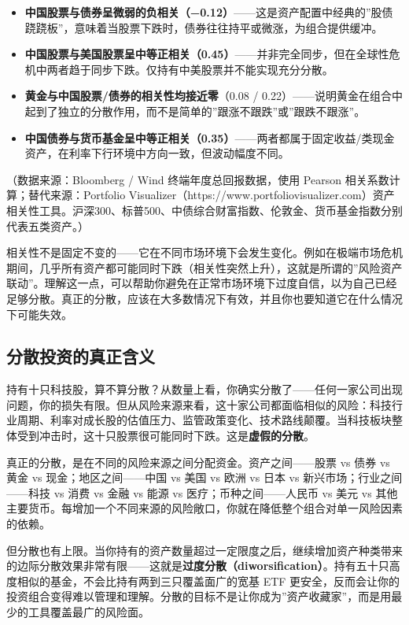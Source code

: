 \documentclass[a4paper,11pt,oneside,fontset=none,UTF8,zihao=-4]{ctexbook}
\providecommand{\tightlist}{\setlength{\itemsep}{2pt}\setlength{\parskip}{1pt}}
\begin{document}
\begin{itemize}
\tightlist
\item
  \textbf{中国股票与债券呈微弱的负相关（−0.12）}------这是资产配置中经典的''股债跷跷板''，意味着当股票下跌时，债券往往持平或微涨，为组合提供缓冲。
\item
  \textbf{中国股票与美国股票呈中等正相关（0.45）}------并非完全同步，但在全球性危机中两者趋于同步下跌。仅持有中美股票并不能实现充分分散。
\item
  \textbf{黄金与中国股票/债券的相关性均接近零}（0.08 /
  0.22）------说明黄金在组合中起到了独立的分散作用，而不是简单的''跟涨不跟跌''或''跟跌不跟涨''。
\item
  \textbf{中国债券与货币基金呈中等正相关（0.35）}------两者都属于固定收益/类现金资产，在利率下行环境中方向一致，但波动幅度不同。
\end{itemize}

（数据来源：Bloomberg / Wind 终端年度总回报数据，使用 Pearson
相关系数计算；替代来源：Portfolio
Visualizer（https://www.portfoliovisualizer.com）资产相关性工具。沪深300、标普500、中债综合财富指数、伦敦金、货币基金指数分别代表五类资产。）

相关性不是固定不变的------它在不同市场环境下会发生变化。例如在极端市场危机期间，几乎所有资产都可能同时下跌（相关性突然上升），这就是所谓的''风险资产联动''。理解这一点，可以帮助你避免在正常市场环境下过度自信，以为自己已经足够分散。真正的分散，应该在大多数情况下有效，并且你也要知道它在什么情况下可能失效。

\subsection{分散投资的真正含义}\label{ux5206ux6563ux6295ux8d44ux7684ux771fux6b63ux542bux4e49}

持有十只科技股，算不算分散？从数量上看，你确实分散了------任何一家公司出现问题，你的损失有限。但从风险来源来看，这十家公司都面临相似的风险：科技行业周期、利率对成长股的估值压力、监管政策变化、技术路线颠覆。当科技板块整体受到冲击时，这十只股票很可能同时下跌。这是\textbf{虚假的分散}。

真正的分散，是在不同的风险来源之间分配资金。资产之间------股票 vs 债券
vs 黄金 vs 现金；地区之间------中国 vs 美国 vs 欧洲 vs 日本 vs
新兴市场；行业之间------科技 vs 消费 vs 金融 vs 能源 vs
医疗；币种之间------人民币 vs 美元 vs
其他主要货币。每增加一个不同来源的风险敞口，你就在降低整个组合对单一风险因素的依赖。

但分散也有上限。当你持有的资产数量超过一定限度之后，继续增加资产种类带来的边际分散效果非常有限------这就是\textbf{过度分散（diworsification）}。持有五十只高度相似的基金，不会比持有两到三只覆盖面广的宽基
ETF
更安全，反而会让你的投资组合变得难以管理和理解。分散的目标不是让你成为''资产收藏家''，而是用最少的工具覆盖最广的风险面。
\end{document}

